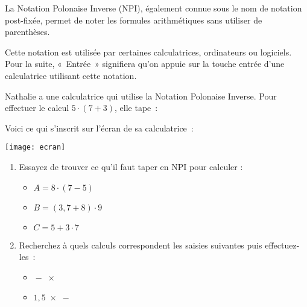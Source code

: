 
\begin{TP}

La Notation Polonaise Inverse (NPI), également connue sous le nom de notation post-fixée, permet de noter les formules arithmétiques sans utiliser de parenthèses.

Cette notation est utilisée par certaines calculatrices, ordinateurs ou logiciels. Pour la suite, « Entrée » signifiera qu'on appuie sur la touche entrée d'une calculatrice utilisant cette notation.


Nathalie a une calculatrice qui utilise la Notation Polonaise Inverse. Pour effectuer le calcul $5 \cdot (7 + 3)$, elle tape : \\[-1em]
\begin{center} \boxed{\textcolor{C2}{7}} \quad \boxed{\textcolor{C2}{Entree}} \quad \boxed{\textcolor{H1}{3}} \quad \boxed{\textcolor{H1}{Entree}} \quad \boxed{\textcolor{BleuOuv}{+}} \quad \boxed{\textcolor{J1}{5}} \quad \boxed{\textcolor{J1}{Entree}} \quad \boxed{\times} \end{center}

\vspace{1em}

Voici ce qui s'inscrit sur l'écran de sa calculatrice :\\[1em]
\begin{center} \texttt{[image: ecran]} \end{center}

\begin{enumerate}
 \item Essayez de trouver ce qu'il faut taper en NPI pour calculer :
 \begin{itemize}
  \item $A = 8 \cdot (7 - 5)$
  \item $B = (3,7 + 8) \cdot 9$
  \item $C = 5 + 3 \cdot 7$
  \end{itemize}
  
 \item Recherchez à quels calculs correspondent les saisies suivantes puis effectuez-les :
  \begin{itemize} 
  
  \vspace{1em}
  
  \item {} \quad {} \quad {} \quad {} \quad $\boxed{-}$ \quad {} \quad {} \quad $\boxed{\times}$ \\[-0.75em]
  \item {} \quad {} \quad {} \quad {} \quad $\boxed{1,5}$ \quad {} \quad $\boxed{\times}$ \quad $\boxed{-}$
  \end{itemize}
  

\end{enumerate}
\end{TP}
